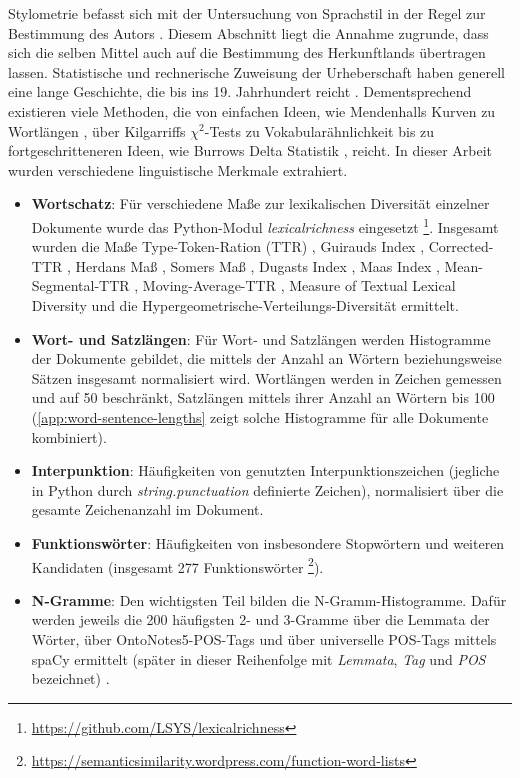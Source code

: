 \documentclass[bachelor,german]{info1thesis}
\begin{document}
Stylometrie befasst sich mit der Untersuchung von Sprachstil in der Regel zur Bestimmung des Autors \cite{Spillner1974}. Diesem Abschnitt liegt die Annahme zugrunde, dass sich die selben Mittel auch auf die Bestimmung des Herkunftlands übertragen lassen. Statistische und rechnerische Zuweisung der Urheberschaft haben generell eine lange Geschichte, die bis ins 19. Jahrhundert reicht \cite{Stamatatos2009}. Dementsprechend existieren viele Methoden, die von einfachen Ideen, wie Mendenhalls Kurven zu Wortlängen \cite{Mendenhall1887}, über Kilgarriffs $\chi^2$-Tests zu Vokabularähnlichkeit \cite{Kilgarriff2001} bis zu fortgeschritteneren Ideen, wie Burrows Delta Statistik \cite{Burrows2002}, reicht. In dieser Arbeit wurden verschiedene linguistische Merkmale extrahiert.
\begin{itemize}
\item \textbf{Wortschatz}: Für verschiedene Maße zur lexikalischen Diversität einzelner Dokumente wurde das Python-Modul \textit{lexicalrichness} eingesetzt \footnote{\url{https://github.com/LSYS/lexicalrichness}}. Insgesamt wurden die Maße Type-Token-Ration (TTR) \cite{Templin1957}, Guirauds Index \cite{Guiraud1954},  Corrected-TTR \cite{Carroll1964}, Herdans Maß \cite{Herdan1964}, Somers Maß \cite{Somers1966}, Dugasts Index \cite{Dugast1978}, Maas Index \cite{Maas1972}, Mean-Segmental-TTR \cite{Torruella2013}, Moving-Average-TTR \cite{Covington2010}, Measure of Textual Lexical Diversity  \cite{McCarthy2010} und die Hypergeometrische-Verteilungs-Diversität \cite{McCarthy2007} ermittelt.
\item \textbf{Wort- und Satzlängen}: Für Wort- und Satzlängen werden Histogramme der Dokumente gebildet, die mittels der Anzahl an Wörtern beziehungsweise Sätzen insgesamt normalisiert wird. Wortlängen werden in Zeichen gemessen und auf 50 beschränkt, Satzlängen mittels ihrer Anzahl an Wörtern bis 100 (\autoref{app:word-sentence-lengths} zeigt solche Histogramme für alle Dokumente kombiniert).
\item \textbf{Interpunktion}: Häufigkeiten von genutzten Interpunktionszeichen (jegliche in Python durch \textit{string.punctuation} definierte Zeichen), normalisiert über die gesamte Zeichenanzahl im Dokument.
\item \textbf{Funktionswörter}: Häufigkeiten von insbesondere Stopwörtern und weiteren Kandidaten (insgesamt 277 Funktionswörter \footnote{\url{https://semanticsimilarity.wordpress.com/function-word-lists}}).
\item \textbf{N-Gramme}: Den wichtigsten Teil bilden die N-Gramm-Histogramme. Dafür werden jeweils die 200 häufigsten 2- und 3-Gramme über die Lemmata der Wörter, über OntoNotes5-POS-Tags und über universelle POS-Tags mittels spaCy ermittelt (später in dieser Reihenfolge mit \textit{Lemmata}, \textit{Tag} und \textit{POS} bezeichnet) \cite{RalphWeischedel2013}.
\end{itemize}
\end{document}
